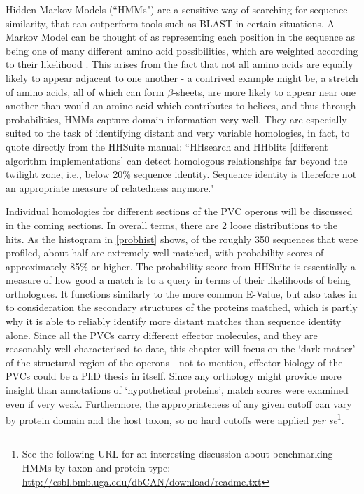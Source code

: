 Hidden Markov Models (``HMMs") are a sensitive way of searching for sequence similarity, that can outperform tools such as BLAST in certain situations. A Markov Model can be thought of as representing each position in the sequence as being one of many different amino acid possibilities, which are weighted according to their likelihood \citep{Eddy2004}. This arises from the fact that not all amino acids are equally likely to appear adjacent to one another - a contrived example might be, a stretch of amino acids, all of which can form $\beta$-sheets, are more likely to appear near one another than would an amino acid which contributes to helices, and thus through probabilities, HMMs capture domain information very well. They are especially suited to the task of identifying distant and very variable homologies, in fact, to quote directly from the HHSuite manual: ``HHsearch and HHblits [different algorithm implementations] can detect homologous relationships far beyond the twilight zone, i.e., below 20\% sequence identity. Sequence identity is therefore not an appropriate measure of relatedness anymore."

Individual homologies for different sections of the PVC operons will be discussed in the coming sections. In overall terms, there are 2 loose distributions to the hits. As the histogram in \vref{probhist} shows, of the roughly 350 sequences that were profiled, about half are extremely well matched, with probability scores of approximately 85\% or higher. The probability score from HHSuite is essentially a measure of how good a match is to a query in terms of their likelihoods of being orthologues. It functions similarly to the more common E-Value, but also takes in to consideration the secondary structures of the proteins matched, which is partly why it is able to reliably identify more distant matches than sequence identity alone. Since all the PVCs carry different effector molecules, and they are reasonably well characterised to date, this chapter will focus on the `dark matter' of the structural region of the operons - not to mention, effector biology of the PVCs could be a PhD thesis in itself. Since any orthology might provide more insight than annotations of `hypothetical proteins', match scores were examined even if very weak. Furthermore, the appropriateness of any given cutoff can vary by protein domain and the host taxon, so no hard cutoffs were applied \emph{per se}\footnote{See the following URL for an interesting discussion about benchmarking HMMs by taxon and protein type: \url{http://csbl.bmb.uga.edu/dbCAN/download/readme.txt}}.

